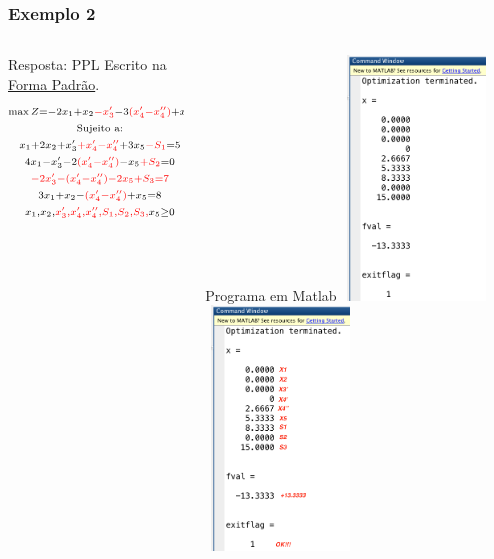 \begin{frame}
	\frametitle{Exemplo 2}
	\begin{columns}
		\begin{column}{0.5\textwidth}
			\begin{exampleblock}{Resposta: PPL Escrito na \underline{Forma Padrão}.}
				\begin{equation*}
					\begin{matrix}
						\scriptstyle \max Z = -2x_1+x_2{\color{red}-x'_3}-3{\color{red}(x'_4 - x''_4)}+x_5 \\
						\scriptstyle \text{Sujeito a:} \\
						\scriptstyle x_1+2x_2{+x'_3}{\color{red}+x'_4 - x''_4}+3x_5 {\color{red}-S_1} = 5 \\
						\scriptstyle 4x_1{-x'_3}-2{\color{red}(x'_4 - x''_4)}-x_5 {\color{red}+S_2} = 0 \\
						\scriptstyle {\color{red}-2{\color{red}x'_3}-{\color{red}(x'_4 - x''_4)}-2x_5 +S_3 = 7} \\
						\scriptstyle 3x_1+x_2-{\color{red}(x'_4 - x''_4)}+x_5 = 8 \\
						\scriptstyle x_1, x_2, {\color{red}x'_3, x'_4, x''_4, S_1, S_2, S_3,} x_5 \ge 0 \\
					\end{matrix}
				\end{equation*}
			\end{exampleblock}
		\end{column}
		\begin{column}{0.5\textwidth}
			\begin{block}{Programa em Matlab}
				\only<1>
				{
				\includegraphics[width=4cm,height=6.5cm]{Exemplo2b.png}
				}
				\only<2>
				{
					\includegraphics[width=4cm,height=6.5cm]{Exemplo2bLINHA.png}
				}
			\end{block}
		\end{column}
	\end{columns}
\end{frame}

